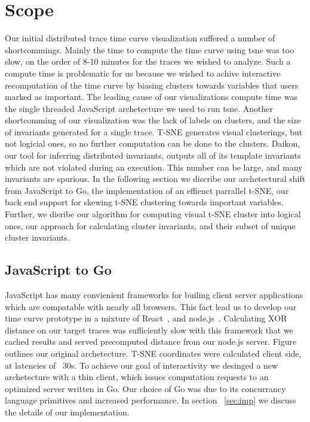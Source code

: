 \section{Scope}
\label{sec:scope}

Our initial distributed trace time curve visualization suffered a number of
shortcommings. Mainly the time to compute the time curve using tsne was too
slow, on the order of 8-10 minutes for the traces we wished to analyze. Such a
compute time is problematic for us because we wished to achive interactive
recomputation of the time curve by biasing clusters towards variables that
users marked as important. The leading cause of our visualizations compute time
was the single threaded JavaScript archetecture we used to run tsne. Another
shortcomming of our visualization was the lack of labels on clusters, and the
size of invariants generated for a single trace. T-SNE generates visual
clusterings, but not logicial ones, so no further computation can be done to
the clusters. Daikon, our tool for inferring distributed invariants, outputs
all of its template invariants which are not violated during an execution. This
number can be large, and many invariants are spurious. In the following section
we discribe our archetectural shift from JavaScript to Go, the implementation
of an effienct parrallel t-SNE, our back end support for skewing t-SNE
clustering towards important variables. Further, we disribe our algorithm for
computing visual t-SNE cluster into logical ones, our approach for calculating
cluster invariants, and their subset of unique cluster invariants.

\subsection{JavaScript to Go}
\label{sec:js2go}

JavaScript has many convienient frameworks for builing client server
applications which are compatable with nearly all browsers. This fact lead us
to develop our time curve prototype in a mixture of React~\cite{react}, and
node.js~\cite{node.js}. Calculating XOR distance on our target traces was
sufficiently slow with this framework that we cached results and served
precomputed distance from our node.js server. Figure outlines our original archetecture. T-SNE coordinates
were calculated client side, at latencies of ~30s. To achieve our goal of
interactivity we desinged a new archetecture with a thin client, which issues
computation requests to an optimized server written in Go. Our choice of Go was
due to its concurrancy language primitives and increased performance. In
section ~\ref{sec:imp} we discuss the details of our implementation.

